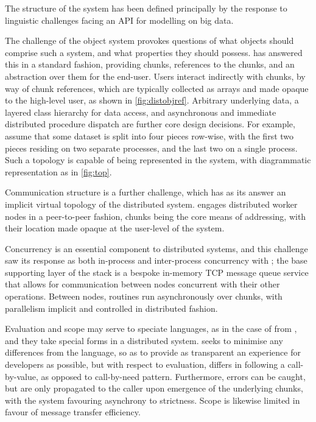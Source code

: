 The structure of the \lsr{} system has been defined principally by the response to linguistic challenges facing an API for modelling on big data.

The challenge of the object system provokes questions of what objects should comprise such a system, and what properties they should possess.
\lsr{} has answered this in a standard fashion, providing chunks, references to the chunks, and an abstraction over them for the end-user.
Users interact indirectly with chunks, by way of chunk references, which are typically collected as arrays and made opaque to the high-level user, as shown in \cref{fig:distobjref}.
Arbitrary underlying data, a layered class hierarchy for data access, and asynchronous and immediate distributed procedure dispatch are further core design decisions.
For example, assume that some dataset is split into four pieces row-wise, with the first two pieces residing on two separate processes, and the last two on a single process.
Such a topology is capable of being represented in the \lsr{} system, with diagrammatic representation as in \cref{fig:top}.



Communication structure is a further challenge, which has as its answer an implicit virtual topology of the distributed system.
\lsr{} engages distributed worker nodes in a peer-to-peer fashion, chunks being the core means of addressing, with their location made opaque at the user-level of the system.

Concurrency is an essential component to distributed systems, and this challenge saw its response as both in-process and inter-process concurrency with \lsr{}; the base supporting layer of the \lsr{} stack is a bespoke in-memory TCP message queue service that allows for communication between nodes concurrent with their other operations.
Between nodes, routines run asynchronously over chunks, with parallelism implicit and controlled in distributed fashion.

Evaluation and scope may serve to speciate languages, as in the case of \R{} from , and they take special forms in a distributed system.
\lsr{} seeks to minimise any differences from the \R{} language, so as to provide as transparent an experience for developers as possible, but with respect to evaluation, differs in following a call-by-value, as opposed to call-by-need pattern.
Furthermore, errors can be caught, but are only propagated to the caller upon emergence of the underlying chunks, with the system favouring asynchrony to strictness.
Scope is likewise limited in favour of message transfer efficiency.

